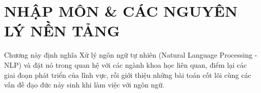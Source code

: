\chapter{NHẬP MÔN \& CÁC NGUYÊN LÝ NỀN TẢNG}
\label{chap:nhap_mon}

Chương này định nghĩa Xử lý ngôn ngữ tự nhiên (Natural Language Processing - NLP) và đặt nó trong quan hệ với các ngành khoa học liên quan, điểm lại các giai đoạn phát triển của lĩnh vực, rồi giới thiệu những bài toán cốt lõi cùng các vấn đề đạo đức nảy sinh khi làm việc với ngôn ngữ.